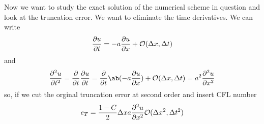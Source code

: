 \documentclass[justified, nobib,a4paper]{tufte-handout}
\begin{document}
Now we want to study the exact solution of the numerical scheme in question and look at the truncation error.
We want to eliminate the time derivatives. We can write
\[
	\pdv{u}{t}=-a\pdv{u}{x} + \mathcal{O}(\Delta x, \Delta t)
\]
and
\[
	\pdv[order=2]{u}{t}=\pdv{}{t}\pdv{u}{t} = \pdv{}{t}\ab(-a\pdv{u}{x}) + \mathcal{O}(\Delta x, \Delta t)
	= a^2\pdv[order=2]{u}{x}
\]
so, if we cut the orginal truncation error at second order and insert CFL number
\[
	e_T = \frac{ 1 -C}{2}\Delta x a\pdv[order=2]{u}{x} \mathcal{O}(\Delta x^2, \Delta t^2)
\]
\end{document}

